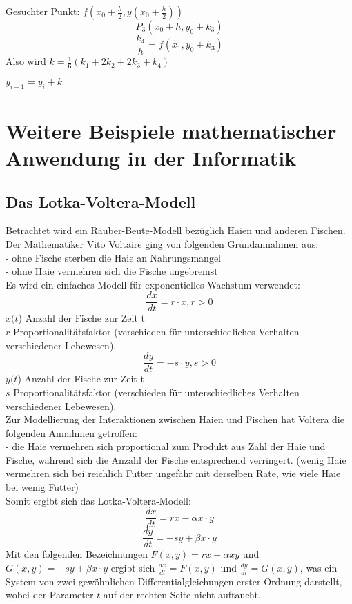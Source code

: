 \documentclass[fontset=ubuntu,12pt,a4paper]{scrreprt}
\begin{document}
Gesuchter Punkt: \(f\left(x_0+\frac{h}{2},y\left(x_0+\frac{h}{2}\right)\right)\)
\[P_3(x_0+h,y_0+k_3)\]
\[\frac{k_4}{h}=f(x_1,y_0+k_3)\]
Also wird \(k=\frac{1}{6}(k_1+2k_2+2k_3+k_4)\)

\(y_{i+1}=y_i+k\)

\chapter{Weitere Beispiele mathematischer Anwendung in der Informatik}
\section{Das Lotka-Voltera-Modell}
Betrachtet wird ein Räuber-Beute-Modell bezüglich Haien und anderen Fischen.\\
Der Mathematiker Vito Voltaire ging von folgenden Grundannahmen aus:  \\
- ohne Fische sterben die Haie an Nahrungsmangel \\
- ohne Haie vermehren sich die Fische ungebremst \\
Es wird ein einfaches Modell für exponentielles Wachstum verwendet: \\
$$\frac{dx}{dt}=r\cdot x, r>0$$ $x(t$) Anzahl der Fische zur Zeit t \\
$r$ Proportionalitätsfaktor (verschieden für unterschiedliches Verhalten verschiedener Lebewesen).
$$\frac{dy}{dt}=-s\cdot y, s>0$$ $y(t$) Anzahl der Fische zur Zeit t \\
$s$ Proportionalitätsfaktor (verschieden für unterschiedliches Verhalten verschiedener Lebewesen). \\ Zur Modellierung der Interaktionen zwischen Haien und Fischen hat Voltera die folgenden Annahmen getroffen: \\
- die Haie vermehren sich proportional zum Produkt aus Zahl der Haie und Fische, während sich die Anzahl der Fische entsprechend verringert. (wenig Haie vermehren sich bei reichlich Futter ungefähr mit derselben Rate, wie viele Haie bei wenig Futter)\\
Somit ergibt sich das Lotka-Voltera-Modell: \\
$$\frac{dx}{dt}=rx-\alpha x\cdot y$$
$$\frac{dy}{dt}=-sy+\beta x\cdot y$$
Mit den folgenden Bezeichnungen $F(x,y)=rx-\alpha xy$ und  $G(x,y)=-sy+\beta x\cdot y$ ergibt sich $\frac{dx}{dt}=F(x,y)$ und $\frac{dy}{dt}=G(x,y)$, was ein System von zwei gewöhnlichen Differentialgleichungen erster Ordnung darstellt, wobei der Parameter $t$ auf der rechten Seite nicht auftaucht. \\
\end{document}
